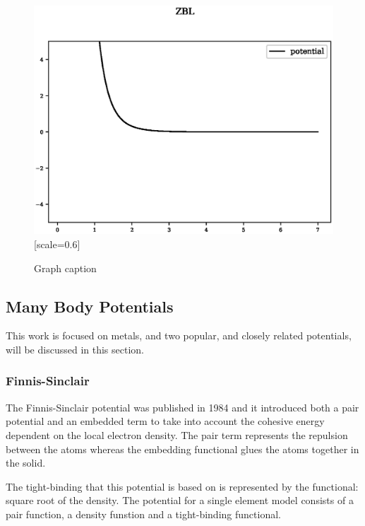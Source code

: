 \begin{figure}[!htbp]
  \begin{center}
    \includegraphics[scale=0.70]{chapters/background_potential_fitting/plots/zbl.eps}[scale=0.6]
    \caption{Graph caption}
    \label{graph:graph1}
  \end{center}
\end{figure}





\subsection{Many Body Potentials}

This work is focused on metals, and two popular, and closely related potentials, will be discussed in this section.

\subsubsection{Finnis-Sinclair}

The Finnis-Sinclair potential was published in 1984 and it introduced both a pair potential and an embedded term to take into account the cohesive energy dependent on the local electron density.  The pair term represents the repulsion between the atoms whereas the embedding functional glues the atoms together in the solid.  

The tight-binding that this potential is based on is represented by the functional: square root of the density.  The potential for a single element model consists of a pair function, a density funstion and a tight-binding functional.

